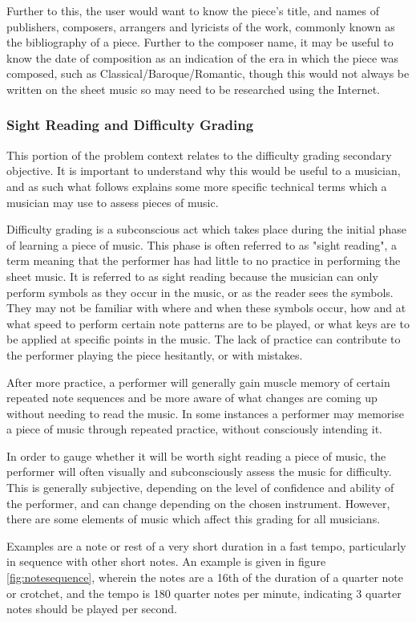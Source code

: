 Further to this, the user would want to know the piece's title, and names of publishers, composers, arrangers and lyricists of the work, commonly known as the bibliography of a piece\parencite{MIR}. Further to the composer name, it may be useful to know the date of composition as an indication of the era in which the piece was composed, such as Classical/Baroque/Romantic, though this would not always be written on the sheet music so may need to be researched using the Internet.

\subsubsection{Sight Reading and Difficulty Grading}
This portion of the problem context relates to the difficulty grading secondary objective. It is important to understand why this would be useful to a musician, and as such what follows explains some more specific technical terms which a musician may use to assess pieces of music.


Difficulty grading is a subconscious act which takes place during the initial phase of learning a piece of music. This phase is often referred to as "sight reading", a term meaning that the performer has had little to no practice in performing the sheet music. It is referred to as sight reading because the musician can only perform symbols as they occur in the music, or as the reader sees the symbols. They may not be familiar with where and when these symbols occur, how and at what speed to perform certain note patterns are to be played, or what keys are to be applied at specific points in the music. The lack of practice can contribute to the performer playing the piece hesitantly, or with mistakes.

After more practice, a performer will generally gain muscle memory of certain repeated note sequences and be more aware of what changes are coming up without needing to read the music. In some instances a performer may memorise a piece of music through repeated practice, without consciously intending it. 

In order to gauge whether it will be worth sight reading a piece of music, the performer will often visually and subconsciously assess the music for difficulty. This is generally subjective, depending on the level of confidence and ability of the performer, and can change depending on the chosen instrument. However, there are some elements of music which affect this grading for all musicians.

Examples are a note or rest of a very short duration in a fast tempo, particularly in sequence with other short notes. An example is given in figure \ref{fig:notesequence}, wherein the notes are a 16th of the duration of a quarter note or crotchet, and the tempo is 180 quarter notes per minute, indicating 3 quarter notes should be played per second.

